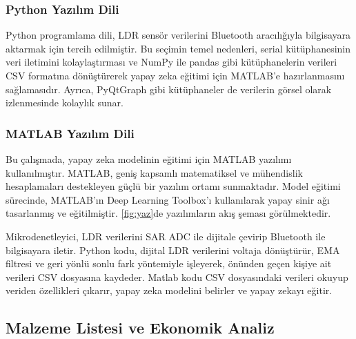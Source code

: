 \subsubsection{Python Yazılım Dili}
Python programlama dili, LDR sensör verilerini Bluetooth aracılığıyla bilgisayara aktarmak için tercih edilmiştir. Bu seçimin temel nedenleri, serial kütüphanesinin veri iletimini kolaylaştırması ve NumPy ile pandas gibi kütüphanelerin verileri CSV formatına dönüştürerek yapay zeka eğitimi için MATLAB'e hazırlanmasını sağlamasıdır. Ayrıca, PyQtGraph gibi kütüphaneler de verilerin görsel olarak izlenmesinde kolaylık sunar.

\subsubsection{MATLAB Yazılım Dili}
Bu çalışmada, yapay zeka modelinin eğitimi için MATLAB yazılımı kullanılmıştır. MATLAB, geniş kapsamlı matematiksel ve mühendislik hesaplamaları destekleyen güçlü bir yazılım ortamı sunmaktadır. Model eğitimi sürecinde, MATLAB'ın Deep Learning Toolbox'ı kullanılarak yapay sinir ağı tasarlanmış ve eğitilmiştir. \ref{fig:yaz}de yazılımların akış şeması görülmektedir.

Mikrodenetleyici, LDR verilerini SAR ADC ile dijitale çevirip Bluetooth ile bilgisayara iletir. Python kodu, dijital LDR verilerini voltaja dönüştürür, EMA filtresi ve geri yönlü sonlu fark yöntemiyle işleyerek, önünden geçen kişiye ait verileri CSV dosyasına kaydeder. Matlab kodu CSV dosyasındaki verileri okuyup veriden özellikleri çıkarır, yapay zeka modelini belirler ve yapay zekayı eğitir.



\subsection{Malzeme Listesi ve Ekonomik Analiz}


